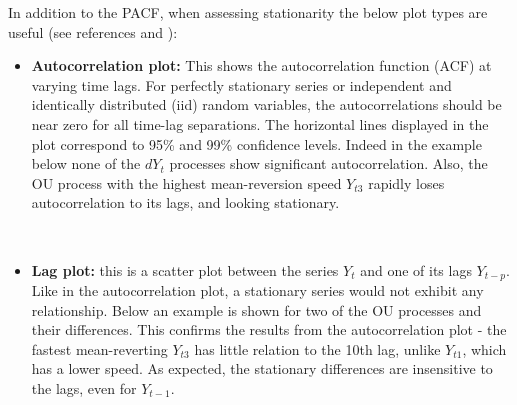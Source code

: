 \documentclass[11pt]{article}
\providecommand{\tightlist}{%
      \setlength{\itemsep}{0pt}\setlength{\parskip}{0pt}}
\begin{document}
In addition to the PACF, when assessing stationarity the below plot types are useful (see
references \cite{pandasref1} and \cite{pandasref2}):
\begin{itemize}
\tightlist
\item
  \textbf{Autocorrelation plot:} This shows the autocorrelation function
  (ACF) at varying time lags. For perfectly stationary series or independent and identically distributed (iid)
  random variables, the autocorrelations should be near zero for all
  time-lag separations. The horizontal lines displayed in the plot
  correspond to 95\% and 99\% confidence levels. Indeed in the example below none of
  the $dY_t$  processes show significant autocorrelation. Also, the
  OU process with the highest mean-reversion speed $Y_{t3}$ rapidly loses
  autocorrelation to its lags, and looking stationary.
\end{itemize}
    \begin{center}
    \end{center}
    { \hspace*{\fill} \\}
    \begin{itemize}
\tightlist
\item
  \textbf{Lag plot:} this is a scatter plot between the series \(Y_t\)
  and one of its lags \(Y_{t-p}\). Like in the autocorrelation plot, a
  stationary series would not exhibit any relationship. Below an example
  is shown for two of the OU processes and their differences. This
  confirms the results from the autocorrelation plot - the fastest
  mean-reverting $Y_{t3}$ has little relation to the 10th lag, unlike $Y_{t1}$,
  which has a lower speed. As expected, the stationary differences are
  insensitive to the lags, even for \(Y_{t-1}\).
\end{itemize}
    \begin{center}
    \end{center}
    { \hspace*{\fill} \\}
\end{document}
